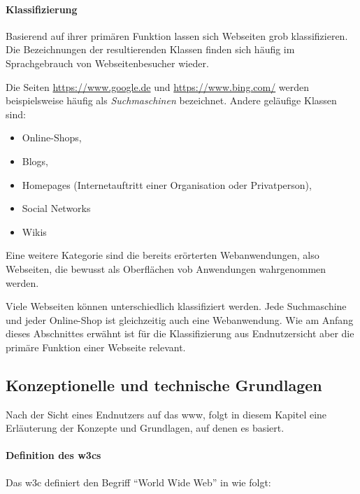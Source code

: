         \paragraph*{Klassifizierung}
        Basierend auf ihrer primären Funktion lassen sich Webseiten grob klassifizieren.
        Die Bezeichnungen der resultierenden Klassen finden sich häufig im Sprachgebrauch
        von Webseitenbesucher wieder.

        Die Seiten \url{https://www.google.de} und \url{https://www.bing.com/}
        werden beispielsweise häufig als \textit{Suchmaschinen} bezeichnet.
        Andere geläufige Klassen sind:

        \begin{itemize}
            \item Online-Shops,
            \item Blogs,
            \item Homepages (Internetauftritt einer Organisation oder Privatperson),
            \item Social Networks
            \item Wikis
        \end{itemize}

        Eine weitere Kategorie sind die bereits erörterten Webanwendungen,
        also Webseiten, die bewusst als Oberflächen vob Anwendungen wahrgenommen werden.

        Viele Webseiten können unterschiedlich klassifiziert werden.
        Jede Suchmaschine und jeder Online-Shop ist gleichzeitig auch eine
        Webanwendung. Wie am Anfang dieses Abschnittes erwähnt ist für die
        Klassifizierung aus Endnutzersicht aber die primäre Funktion einer Webseite
        relevant.

    \subsection{Konzeptionelle und technische Grundlagen}
        \label{section:wwwTechnicalFoundations}
        Nach der Sicht eines Endnutzers auf das \gls{www},
        folgt in diesem Kapitel eine Erläuterung der Konzepte und Grundlagen,
        auf denen es basiert.

        \paragraph*{Definition des \glspl{w3c}}
        Das \gls{w3c} definiert den Begriff "`World Wide Web"' in \cite{w3c:wwwArch} wie folgt:


